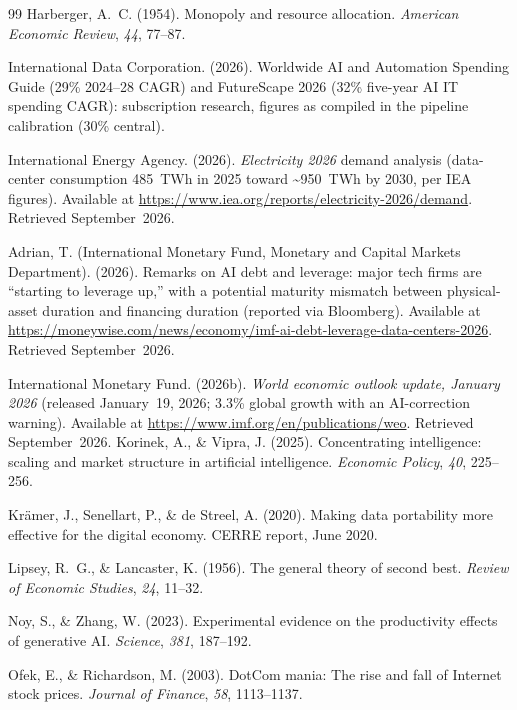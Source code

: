 \documentclass[11pt,a4paper]{article}
\begin{document}
\begin{thebibliography}{99}
Harberger, A.~C. (1954).
Monopoly and resource allocation.
\emph{American Economic Review}, \emph{44}, 77--87.

International Data Corporation. (2026).
Worldwide AI and Automation Spending Guide (29\% 2024--28 CAGR) and
FutureScape 2026 (32\% five-year AI IT spending CAGR): subscription
research, figures as compiled in the pipeline calibration (30\% central).

International Energy Agency. (2026).
\emph{Electricity 2026} demand analysis (data-center consumption
485~TWh in 2025 toward \textasciitilde950~TWh by 2030, per IEA figures).
Available at \url{https://www.iea.org/reports/electricity-2026/demand}.
Retrieved September~2026.

Adrian, T. (International Monetary Fund, Monetary and Capital Markets
Department). (2026).
Remarks on AI debt and leverage: major tech firms are ``starting to
leverage up,'' with a potential maturity mismatch between physical-asset
duration and financing duration (reported via Bloomberg).
Available at \url{https://moneywise.com/news/economy/imf-ai-debt-leverage-data-centers-2026}.
Retrieved September~2026.

International Monetary Fund. (2026b).
\emph{World economic outlook update, January 2026} (released January~19,
2026; 3.3\% global growth with an AI-correction warning).
Available at \url{https://www.imf.org/en/publications/weo}.
Retrieved September~2026.
Korinek, A., \& Vipra, J. (2025).
Concentrating intelligence: scaling and market structure in artificial intelligence.
\emph{Economic Policy}, \emph{40}, 225--256.

Kr\"amer, J., Senellart, P., \& de Streel, A. (2020).
Making data portability more effective for the digital economy.
CERRE report, June 2020.

Lipsey, R.~G., \& Lancaster, K. (1956).
The general theory of second best.
\emph{Review of Economic Studies}, \emph{24}, 11--32.

Noy, S., \& Zhang, W. (2023).
Experimental evidence on the productivity effects of generative AI.
\emph{Science}, \emph{381}, 187--192.

Ofek, E., \& Richardson, M. (2003).
DotCom mania: The rise and fall of Internet stock prices.
\emph{Journal of Finance}, \emph{58}, 1113--1137.


\end{thebibliography}
\end{document}
